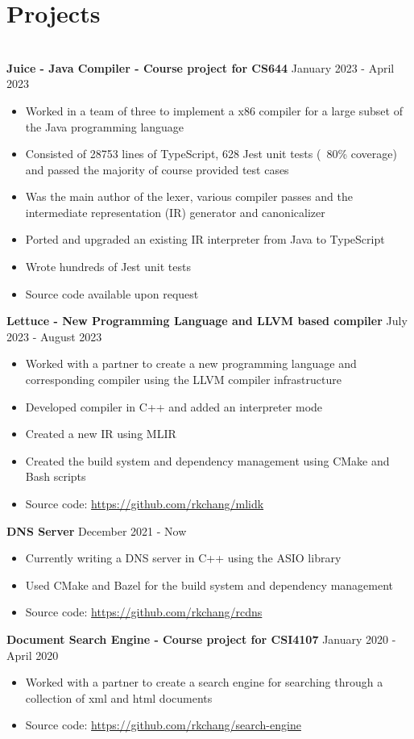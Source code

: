 \documentclass{article}
\begin{document}
\section{Projects}
\hrulefill \\
\textbf{Juice - Java Compiler - Course project for CS644} \hfill January 2023 - April 2023
\begin{itemize}[noitemsep]
    \item Worked in a team of three to implement a x86 compiler for a large subset of the Java programming language
    \item Consisted of 28753 lines of TypeScript, 628 Jest unit tests (~80\% coverage) and passed the majority of course provided test cases
    \item Was the main author of the lexer, various compiler passes and the intermediate representation (IR) generator and canonicalizer
    \item Ported and upgraded an existing IR interpreter from Java to TypeScript
    \item Wrote hundreds of Jest unit tests
    \item Source code available upon request
\end{itemize}

\textbf{Lettuce - New Programming Language and LLVM based compiler} \hfill July 2023 - August 2023
\begin{itemize}[noitemsep]
    \item Worked with a partner to create a new programming language and corresponding compiler using the LLVM compiler infrastructure
    \item Developed compiler in C++ and added an interpreter mode
    \item Created a new IR using MLIR
    \item Created the build system and dependency management using CMake and Bash scripts
    \item Source code: \url{https://github.com/rkchang/mlidk}
\end{itemize}

\textbf{DNS Server} \hfill December 2021 - Now
\begin{itemize}[noitemsep]
    \item Currently writing a DNS server in C++ using the ASIO library
    \item Used CMake and Bazel for the build system and dependency management
    \item Source code: \url{https://github.com/rkchang/rcdns}
\end{itemize}

\textbf{Document Search Engine - Course project for CSI4107} \hfill January 2020 - April 2020
\begin{itemize}[noitemsep]
    \item Worked with a partner to create a search engine for searching through a collection of xml and html documents
    \item Source code: \url{https://github.com/rkchang/search-engine}
\end{itemize}
\end{document}
